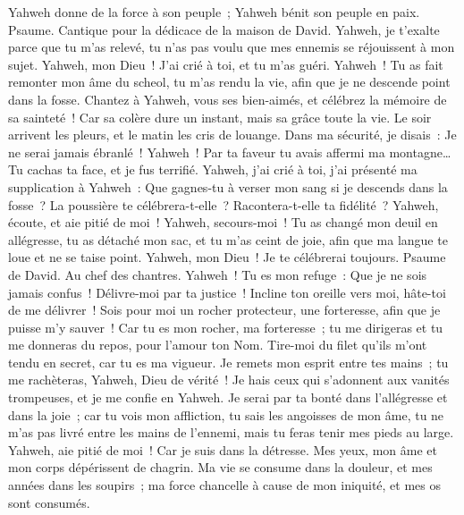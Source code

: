 \begin{multicols}{2}
Yahweh donne de la force à son peuple~; Yahweh bénit son peuple en paix.
\VerseOne{}Psaume. Cantique pour la dédicace de la maison de David.
Yahweh, je t'exalte parce que tu m'as relevé, tu n'as pas voulu que mes ennemis se réjouissent à mon sujet.
Yahweh, mon Dieu~! J'ai crié à toi, et tu m'as guéri.
Yahweh~! Tu as fait remonter mon âme du scheol, tu m'as rendu la vie, afin que je ne descende point dans la fosse.
Chantez à Yahweh, vous ses bien-aimés, et célébrez la mémoire de sa sainteté~!
Car sa colère dure un instant, mais sa grâce toute la vie. Le soir arrivent les pleurs, et le matin les cris de louange.
Dans ma sécurité, je disais~: Je ne serai jamais ébranlé~!
Yahweh~! Par ta faveur tu avais affermi ma montagne… Tu cachas ta face, et je fus terrifié.
Yahweh, j'ai crié à toi, j'ai présenté ma supplication à Yahweh~:
Que gagnes-tu à verser mon sang si je descends dans la fosse~? La poussière te célébrera-t-elle~? Racontera-t-elle ta fidélité~?
Yahweh, écoute, et aie pitié de moi~! Yahweh, secours-moi~!
Tu as changé mon deuil en allégresse, tu as détaché mon sac, et tu m'as ceint de joie,
afin que ma langue te loue et ne se taise point. Yahweh, mon Dieu~! Je te célébrerai toujours.
\VerseOne{}Psaume de David. Au chef des chantres.
Yahweh~! Tu es mon refuge~: Que je ne sois jamais confus~! Délivre-moi par ta justice~!
Incline ton oreille vers moi, hâte-toi de me délivrer~! Sois pour moi un rocher protecteur, une forteresse, afin que je puisse m'y sauver~!
Car tu es mon rocher, ma forteresse~; tu me dirigeras et tu me donneras du repos, pour l'amour ton Nom.
Tire-moi du filet qu'ils m'ont tendu en secret, car tu es ma vigueur.
Je remets mon esprit entre tes mains~; tu me rachèteras, Yahweh, Dieu de vérité~!
Je hais ceux qui s'adonnent aux vanités trompeuses, et je me confie en Yahweh.
Je serai par ta bonté dans l'allégresse et dans la joie~; car tu vois mon affliction, tu sais les angoisses de mon âme,
tu ne m'as pas livré entre les mains de l'ennemi, mais tu feras tenir mes pieds au large.
Yahweh, aie pitié de moi~! Car je suis dans la détresse. Mes yeux, mon âme et mon corps dépérissent de chagrin.
Ma vie se consume dans la douleur, et mes années dans les soupirs~; ma force chancelle à cause de mon iniquité, et mes os sont consumés.

\end{multicols}
